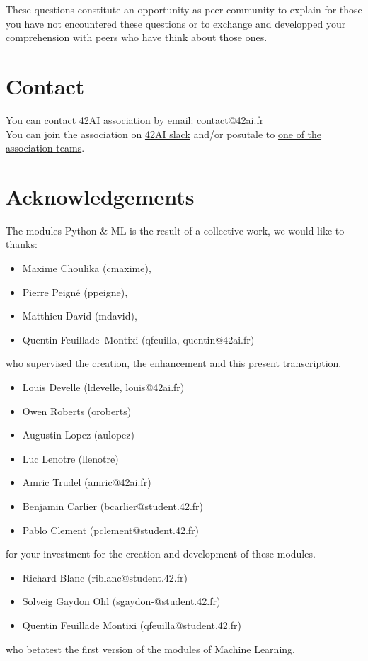 \documentclass{42-en}
\begin{document}
These questions constitute an opportunity as peer community to explain for those you have not encountered these questions
or to exchange and developped your comprehension with peers who have think about those ones.


\newpage

\section*{Contact}
You can contact 42AI association by email: contact@42ai.fr\\
You can join the association on \href{https://join.slack.com/t/42-ai/shared_invite/zt-ebccw5r7-YPkDM6xOiYRPjqJXkrKgcA}{42AI slack}
and/or posutale to \href{https://forms.gle/VAFuREWaLmaqZw2D8}{one of the association teams}.

\section*{Acknowledgements}
The modules Python \& ML is the result of a collective work, we would like to thanks:
\begin{itemize}
  \item Maxime Choulika (cmaxime),
  \item Pierre Peigné (ppeigne),
  \item Matthieu David (mdavid),
  \item Quentin Feuillade--Montixi (qfeuilla, quentin@42ai.fr)
\end{itemize}
who supervised the creation, the enhancement and this present transcription.

\begin{itemize}
  \item Louis Develle (ldevelle, louis@42ai.fr)
  \item Owen Roberts (oroberts)
  \item Augustin Lopez (aulopez)
  \item Luc Lenotre (llenotre)
  \item Amric Trudel (amric@42ai.fr)
  \item Benjamin Carlier (bcarlier@student.42.fr)
  \item Pablo Clement (pclement@student.42.fr)
\end{itemize}
for your investment for the creation and development of these modules.

\begin{itemize}
  \item Richard Blanc (riblanc@student.42.fr)
  \item Solveig Gaydon Ohl (sgaydon-@student.42.fr)
  \item Quentin Feuillade Montixi (qfeuilla@student.42.fr)
\end{itemize}
who betatest the first version of the modules of Machine Learning.
\vfill
\doclicenseThis
\end{document}
